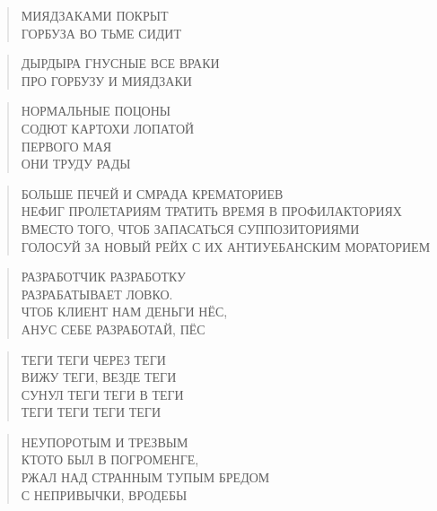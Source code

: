 \poemtitle{***}
\begin{verse}
МИЯДЗАКАМИ ПОКРЫТ\\
ГОРБУЗА ВО ТЬМЕ СИДИТ
\end{verse}

\poemtitle{***}
\begin{verse}
ДЫРДЫРА ГНУСНЫЕ ВСЕ ВРАКИ\\
ПРО ГОРБУЗУ И МИЯДЗАКИ
\end{verse}

\poemtitle{***}
\begin{verse}
НОРМАЛЬНЫЕ ПОЦОНЫ\\
СОДЮТ КАРТОХИ ЛОПАТОЙ\\
ПЕРВОГО МАЯ\\
ОНИ ТРУДУ РАДЫ
\end{verse}

\poemtitle{***}
\begin{verse}
БОЛЬШЕ ПЕЧЕЙ И СМРАДА КРЕМАТОРИЕВ\\
НЕФИГ ПРОЛЕТАРИЯМ ТРАТИТЬ ВРЕМЯ В ПРОФИЛАКТОРИЯХ\\
ВМЕСТО ТОГО, ЧТОБ ЗАПАСАТЬСЯ СУППОЗИТОРИЯМИ\\
ГОЛОСУЙ ЗА НОВЫЙ РЕЙХ С ИХ АНТИУЕБАНСКИМ МОРАТОРИЕМ
\end{verse}

\poemtitle{***}
\begin{verse}
РАЗРАБОТЧИК РАЗРАБОТКУ\\
РАЗРАБАТЫВАЕТ ЛОВКО.\\
ЧТОБ КЛИЕНТ НАМ ДЕНЬГИ НЁС,\\
АНУС СЕБЕ РАЗРАБОТАЙ, ПЁС
\end{verse}

\poemtitle{***}
\begin{verse}
ТЕГИ ТЕГИ ЧЕРЕЗ ТЕГИ\\
ВИЖУ ТЕГИ, ВЕЗДЕ ТЕГИ\\
СУНУЛ ТЕГИ ТЕГИ В ТЕГИ\\
ТЕГИ ТЕГИ ТЕГИ ТЕГИ
\end{verse}

\poemtitle{***}
\begin{verse}
НЕУПОРОТЫМ И ТРЕЗВЫМ\\
КТОТО БЫЛ В ПОГРОМЕНГЕ,\\
РЖАЛ НАД СТРАННЫМ ТУПЫМ БРЕДОМ\\
С НЕПРИВЫЧКИ, ВРОДЕБЫ
\end{verse}

